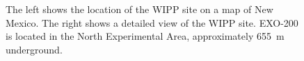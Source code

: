 \documentclass[herrin-thesis.tex]{subfiles}
\begin{document}
\begin{figure}[htb]
\begin{subfigure}[b]{0.60\linewidth}
\end{subfigure}
\caption[The WIPP Site]{The left shows the location of the WIPP site on a map of New Mexico. The right shows a detailed view of the WIPP site. EXO-200 is located in the North Experimental Area, approximately \SI{655}{\m} underground.}
\label{fig:el_attachment_vs_efield}
\label{fig:el_lifetime_vs_efield}
\end{figure}
\end{document}
